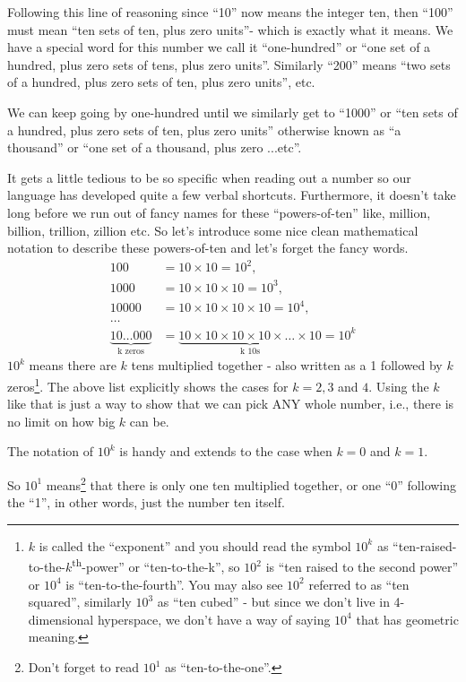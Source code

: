 \documentclass{article}
\begin{document}
Following this line of reasoning since ``10'' now means the integer ten,
then ``100'' must mean ``ten sets of ten,
plus zero units''- which is exactly what it means.
We have a special word for this number we call it ``one-hundred'' or ``one set of a hundred,
plus zero sets of tens, plus zero units''.
Similarly ``200'' means ``two sets of a hundred, plus zero sets of ten,
plus zero units'', etc.

We can keep going by one-hundred until we similarly get to ``1000'' or ``ten sets of a hundred,
plus zero sets of ten, plus zero units'' otherwise known
as ``a thousand'' or ``one set of a thousand, plus zero ...etc''.

It gets a little tedious to be so specific when reading out
a number so our language has developed quite a few verbal shortcuts.
Furthermore, it doesn't take long before we run out of fancy names
for these ``powers-of-ten'' like, million, billion, trillion,
zillion etc. So let's introduce some nice clean mathematical notation
to describe these powers-of-ten and let's forget the fancy words.
\begin{align*}
100&=10\times10=10^2,\\
1000&= 10\times10\times10=10^3,\\
10000&= 10\times10\times10\times10=10^4,\\
\dots{}\\
\underbrace{10\dots{}000}_\text{k zeros}&=
\underbrace{10\times10\times10\times10\times\dots{}\times10}_\text{k 10s}=10^k
\end{align*}
$10^k$ means there are $k$ tens multiplied together - 
also written as a 1 followed by $k$ zeros\footnote{$k$ is called the ``exponent'' and you should
read the symbol $10^k$ as ``ten-raised-to-the-$k$\textsuperscript{th}-power'' or ``ten-to-the-k'',
so $10^2$ is ``ten raised to the second power'' or $10^4$ is ``ten-to-the-fourth''.
You may also see $10^2$ referred to as ``ten squared'',
similarly $10^3$ as ``ten cubed'' - but since we 
don't live in 4-dimensional hyperspace,
we don't have a way of saying $10^4$ that has geometric meaning.}.
The above list explicitly shows the cases for $k = 2, 3$ and $4$.
Using the $k$ like that is just a way to show that we can pick ANY whole number,
i.e., there is no limit on how big $k$ can be.

The notation of $10^k$ is handy and extends
to the case when $k=0$ and $k=1$.

So $10^1$ means\footnote{Don't forget to read $10^1$
as ``ten-to-the-one''.} that there is only one ten multiplied together,
or one ``0'' following the ``1'',
in other words, just the number ten itself.
\end{document}
